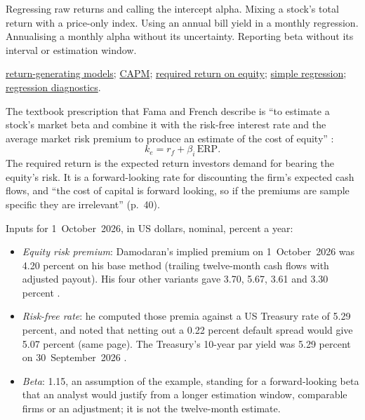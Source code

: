 \begin{qfmethod}
 Regressing raw returns and calling the intercept alpha. Mixing a stock's total return with a price-only index. Using an annual bill yield in a monthly regression. Annualising a monthly alpha without its uncertainty. Reporting beta without its interval or estimation window.

 \hyperref[mod:return-generating-models]{return-generating models}; \hyperref[mod:capm-sml]{CAPM}; \hyperref[meth:required-return-on-equity]{required return on equity}; \hyperref[meth:simple-regression-estimation]{simple regression}; \hyperref[meth:regression-diagnostics-anova]{regression diagnostics}.

\end{qfmethod}

\begin{qfmethod}\label{meth:required-return-on-equity}
 The textbook prescription that Fama and French describe is ``to estimate a stock's market beta and combine it with the risk-free interest rate and the average market risk premium to produce an estimate of the cost of equity'' \citep[\emph{JEP} 18(3), 2004, p.~43]{capm-theory-evidence-2004}:
\[ k_e=r_f+\beta_i\,\mathrm{ERP}. \]
The required return is the expected return investors demand for bearing the equity's risk. It is a forward-looking rate for discounting the firm's expected cash flows, and ``the cost of capital is forward looking, so if the premiums are sample specific they are irrelevant'' (p.~40).

 Inputs for 1~October~2026, in US dollars, nominal, percent a year:
\begin{itemize}
\item \emph{Equity risk premium}: Damodaran's implied premium on 1~October~2026 was 4.20 percent on his base method (trailing twelve-month cash flows with adjusted payout). His four other variants gave 3.70, 5.67, 3.61 and 3.30 percent \citep[home page, ``Equity Risk Premiums'', read 2026-10-18]{implied-equity-premium-2026}.
\item \emph{Risk-free rate}: he computed those premia against a US Treasury rate of 5.29 percent, and noted that netting out a 0.22 percent default spread would give 5.07 percent (same page). The Treasury's 10-year par yield was 5.29 percent on 30~September~2026 \citep[2026 file, retrieved 2026-10-18]{ust-par-yield-curve}.
\item \emph{Beta}: 1.15, an assumption of the example, standing for a forward-looking beta that an analyst would justify from a longer estimation window, comparable firms or an adjustment; it is not the twelve-month estimate.
\end{itemize}


\end{qfmethod}
